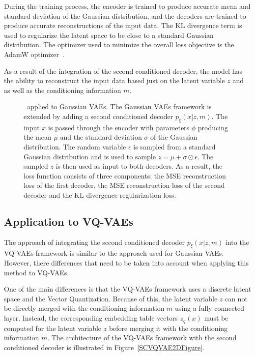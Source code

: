 During the training process, the encoder is trained to produce accurate mean
and standard deviation of the Gaussian distribution, and the decoders are
trained to produce accurate reconstructions of the input data. The KL
divergence term is used to regularize the latent space to be close to a
standard Gaussian distribution. The optimizer used to minimize the overall loss
objective is the AdamW optimizer~\cite{AdamW}.

As a result of the integration of the second conditioned decoder, the model has
the ability to reconstruct the input data based just on the latent variable $z$
and as well as the conditioning information $m$.
\begin{figure}[H]
    \centering
    
    \caption[ applied to Gaussian VAEs.]%
    {
        \methodOne\ applied to Gaussian VAEs. The Gaussian VAEs framework is extended by adding a second conditioned decoder $p_\xi(x|z,m)$. The input $x$ is passed through the encoder with parameters $\phi$ producing the mean $\mu$ and the standard deviation $\sigma$ of the Gaussian distribution. The random variable $\epsilon$ is sampled from a standard Gaussian distribution and is used to sample $ z = \mu + \sigma \odot \epsilon$. The sampled $z$ is then used as input to both decoders. As a result, the loss function consists of three components: the MSE reconstruction loss of the first decoder, the MSE reconstruction loss of the second decoder and the KL divergence regularization loss.
    }\label{SCVAE2DFigure}
\end{figure}

\subsection{Application to VQ-VAEs}

The approach of integrating the second conditioned decoder $p_\xi(x|z,m)$ into
the VQ-VAEs framework is similar to the approach used for Gaussian VAEs.
However, there differences that need to be taken into account when applying
this method to VQ-VAEs.

One of the main differences is that the VQ-VAEs framework uses a discrete
latent space and the Vector Quantization. Because of this, the latent variable
$z$ can not be directly merged with the conditioning information $m$ using a
fully connected layer. Instead, the corresponding embedding table vectors
$z_q(x)$ must be computed for the latent variable $z$ before merging it with
the conditioning information $m$. The architecture of the VQ-VAEs framework
with the second conditioned decoder is illustrated in
Figure~\ref{SCVQVAE2DFigure}.

